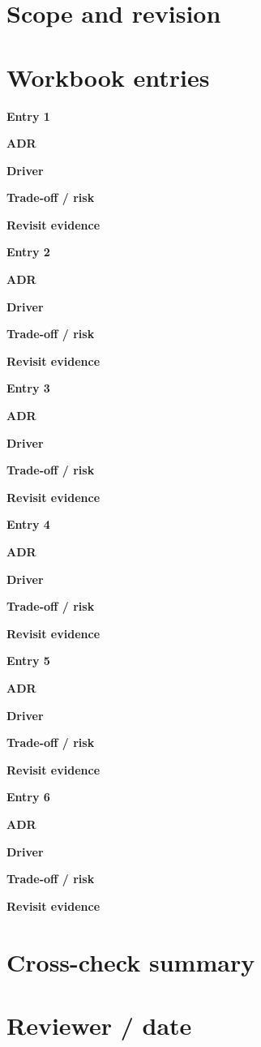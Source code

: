 \documentclass[10pt,letterpaper]{article}
\begin{document}
\DocProvenance
\section{Scope and revision}
\section{Workbook entries}
\textbf{Entry 1}\par
\textbf{ADR}\par{}
\textbf{Driver}\par{}
\textbf{Trade-off / risk}\par{}
\textbf{Revisit evidence}\par{}
\textbf{Entry 2}\par
\textbf{ADR}\par{}
\textbf{Driver}\par{}
\textbf{Trade-off / risk}\par{}
\textbf{Revisit evidence}\par{}
\textbf{Entry 3}\par
\textbf{ADR}\par{}
\textbf{Driver}\par{}
\textbf{Trade-off / risk}\par{}
\textbf{Revisit evidence}\par{}
\textbf{Entry 4}\par
\textbf{ADR}\par{}
\textbf{Driver}\par{}
\textbf{Trade-off / risk}\par{}
\textbf{Revisit evidence}\par{}
\textbf{Entry 5}\par
\textbf{ADR}\par{}
\textbf{Driver}\par{}
\textbf{Trade-off / risk}\par{}
\textbf{Revisit evidence}\par{}
\textbf{Entry 6}\par
\textbf{ADR}\par{}
\textbf{Driver}\par{}
\textbf{Trade-off / risk}\par{}
\textbf{Revisit evidence}\par{}
\section{Cross-check summary}
\section{Reviewer / date}
\end{document}
